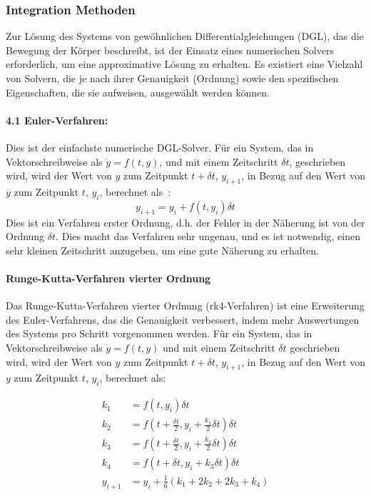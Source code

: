 \documentclass[a4paper,12pt,twoside]{article}
\begin{document}
\subsubsection{Integration Methoden}
Zur Lösung des Systems von gewöhnlichen Differentialgleichungen (DGL), das die 
Bewegung der Körper beschreibt, ist der Einsatz eines numerischen Solvers erforderlich, 
um eine approximative Lösung zu erhalten. Es existiert eine Vielzahl von Solvern, 
die je nach ihrer Genauigkeit (Ordnung) sowie den spezifischen Eigenschaften, 
die sie aufweisen, ausgewählt werden können.

\paragraph{4.1 Euler-Verfahren: }
Dies ist der einfachste numerische DGL-Solver. Für ein System, das in Vektorschreibweise 
als $ \dot{y} = f(t, y) $, und mit einem Zeitschritt $\delta t$, geschrieben wird, 
wird der Wert von $y$ zum Zeitpunkt $t + \delta t$, $y_{i+1}$, in Bezug auf den Wert 
von $y$ zum Zeitpunkt $t$, $y_i$, berechnet als~\cite{Zhou&Long2018}:
\begin{equation*}
    y_{i+1} = y_i + f(t, y_i)\delta t
\end{equation*}
Dies ist ein Verfahren erster Ordnung, d.h. der Fehler in der Näherung ist von 
der Ordnung $\delta t$. Dies macht das Verfahren sehr ungenau, und es ist notwendig, 
einen sehr kleinen Zeitschritt anzugeben, um eine gute Näherung zu erhalten.

\paragraph{Runge-Kutta-Verfahren vierter Ordnung}
Das Runge-Kutta-Verfahren vierter Ordnung (rk4-Verfahren) ist eine Erweiterung des 
Euler-Verfahrens, das die Genauigkeit verbessert, indem mehr Auswertungen des Systems 
pro Schritt vorgenommen werden. Für ein System, das in Vektorschreibweise 
als $\dot{y} = f(t, y)$ und mit einem Zeitschritt $\delta t$ geschrieben wird, 
wird der Wert von $y$ zum Zeitpunkt $t + \delta t$, $y_{i+1}$, in Bezug auf den 
Wert von $y$ zum Zeitpunkt $t$, $y_i$, berechnet als:

\begin{align*}
    k_1 &= f(t, y_i)\delta t \\
    k_2 &= f\left(t + \frac{\delta t}{2}, y_i + \frac{k_1}{2} \delta t \right) \delta t \\
    k_3 &= f\left(t + \frac{\delta t}{2}, y_i + \frac{k_2}{2} \delta t \right) \delta t \\
    k_4 &= f(t + \delta t, y_i + k_3 \delta t) \delta t \\
    y_{i+1} &= y_i + \frac{1}{6}(k_1 + 2k_2 + 2k_3 + k_4)
\end{align*}
\end{document}

